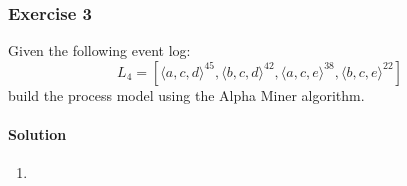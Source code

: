 \subsubsection{Exercise 3}
Given the following event log:
\[L_4 = [\langle a,c,d \rangle^45, \langle b,c,d \rangle^42, \langle a,c,e \rangle^38, \langle b,c,e \rangle^22]\]
build the process model using the Alpha Miner algorithm.
\paragraph{Solution}
\begin{enumerate}
    \item 
\end{enumerate}